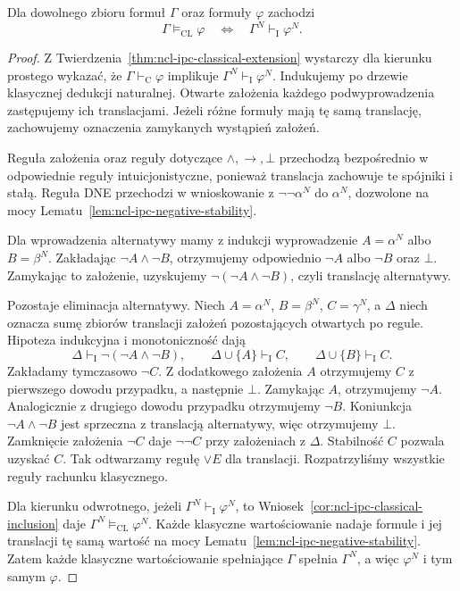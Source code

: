 \begin{twierdzenie}
\label{thm:ncl-ipc-godel-gentzen}
Dla dowolnego zbioru formuł $\Gamma$ oraz formuły
$\varphi$ zachodzi
\[
 \Gamma\models_{\mathrm{CL}}\varphi
 \quad\Longleftrightarrow\quad
 \Gamma^N\vdash_{\mathrm I}\varphi^N.
\]
\end{twierdzenie}
\begin{proof}
Z Twierdzenia~\ref{thm:ncl-ipc-classical-extension}
wystarczy dla kierunku prostego wykazać, że
$\Gamma\vdash_{\mathrm C}\varphi$ implikuje
$\Gamma^N\vdash_{\mathrm I}\varphi^N$.
Indukujemy po drzewie klasycznej dedukcji naturalnej.
Otwarte założenia każdego podwyprowadzenia
zastępujemy ich translacjami. Jeżeli różne
formuły mają tę samą translację, zachowujemy
oznaczenia zamykanych wystąpień założeń.

Reguła założenia oraz reguły dotyczące
$\wedge,\to,\bot$ przechodzą bezpośrednio
w odpowiednie reguły intuicjonistyczne, ponieważ
translacja zachowuje te spójniki i stałą.
Reguła DNE przechodzi w wnioskowanie
z $\neg\neg\alpha^N$ do $\alpha^N$, dozwolone
na mocy Lematu~\ref{lem:ncl-ipc-negative-stability}.

Dla wprowadzenia alternatywy mamy z indukcji
wyprowadzenie $A=\alpha^N$ albo $B=\beta^N$.
Zakładając $\neg A\wedge\neg B$, otrzymujemy
odpowiednio $\neg A$ albo $\neg B$ oraz $\bot$.
Zamykając to założenie, uzyskujemy
$\neg(\neg A\wedge\neg B)$, czyli translację
alternatywy.

Pozostaje eliminacja alternatywy. Niech
$A=\alpha^N$, $B=\beta^N$, $C=\gamma^N$,
a $\Delta$ niech oznacza sumę zbiorów translacji
założeń pozostających otwartych po regule.
Hipoteza indukcyjna i monotoniczność dają
\[
 \Delta\vdash_{\mathrm I}\neg(\neg A\wedge\neg B),
 \qquad
 \Delta\cup\{A\}\vdash_{\mathrm I}C,\qquad
 \Delta\cup\{B\}\vdash_{\mathrm I}C.
\]
Zakładamy tymczasowo $\neg C$.
Z dodatkowego założenia $A$ otrzymujemy $C$
z pierwszego dowodu przypadku, a następnie $\bot$.
Zamykając $A$, otrzymujemy $\neg A$.
Analogicznie z drugiego dowodu przypadku
otrzymujemy $\neg B$.
Koniunkcja $\neg A\wedge\neg B$ jest sprzeczna
z translacją alternatywy, więc otrzymujemy $\bot$.
Zamknięcie założenia $\neg C$ daje $\neg\neg C$
przy założeniach z $\Delta$.
Stabilność $C$ pozwala uzyskać $C$.
Tak odtwarzamy regułę $\vee E$ dla translacji.
Rozpatrzyliśmy wszystkie reguły rachunku klasycznego.

Dla kierunku odwrotnego, jeżeli
$\Gamma^N\vdash_{\mathrm I}\varphi^N$, to
Wniosek~\ref{cor:ncl-ipc-classical-inclusion}
daje $\Gamma^N\models_{\mathrm{CL}}\varphi^N$.
Każde klasyczne wartościowanie nadaje formule
i jej translacji tę samą wartość na mocy
Lematu~\ref{lem:ncl-ipc-negative-stability}.
Zatem każde klasyczne wartościowanie spełniające
$\Gamma$ spełnia $\Gamma^N$, a więc $\varphi^N$
i tym samym $\varphi$.
\end{proof}

